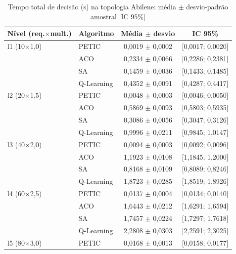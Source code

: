 \begin{table}[htb]
    \centering
    \small
    \caption{Tempo total de decisão (s) na topologia Abilene: média $\pm$ desvio-padrão amostral [IC 95\%]}
    \label{tab:tempo-abilene}
    \begin{tabular}{llcc}
        \hline
        Nível (req.$\times$mult.) & Algoritmo & Média $\pm$ desvio & IC 95\% \\
        \hline
        l1 (10$\times$1,0) & PETIC & 0,0019 $\pm$ 0,0002 & [0,0017; 0,0020] \\
         & ACO & 0,2334 $\pm$ 0,0066 & [0,2286; 0,2381] \\
         & SA & 0,1459 $\pm$ 0,0036 & [0,1433; 0,1485] \\
         & Q-Learning & 0,4352 $\pm$ 0,0091 & [0,4287; 0,4417] \\
        \hline
        l2 (20$\times$1,5) & PETIC & 0,0048 $\pm$ 0,0003 & [0,0046; 0,0050] \\
         & ACO & 0,5869 $\pm$ 0,0093 & [0,5803; 0,5935] \\
         & SA & 0,3086 $\pm$ 0,0056 & [0,3047; 0,3126] \\
         & Q-Learning & 0,9996 $\pm$ 0,0211 & [0,9845; 1,0147] \\
        \hline
        l3 (40$\times$2,0) & PETIC & 0,0094 $\pm$ 0,0003 & [0,0092; 0,0096] \\
         & ACO & 1,1923 $\pm$ 0,0108 & [1,1845; 1,2000] \\
         & SA & 0,8168 $\pm$ 0,0109 & [0,8089; 0,8246] \\
         & Q-Learning & 1,8723 $\pm$ 0,0285 & [1,8519; 1,8926] \\
        \hline
        l4 (60$\times$2,5) & PETIC & 0,0137 $\pm$ 0,0004 & [0,0134; 0,0140] \\
         & ACO & 1,6443 $\pm$ 0,0212 & [1,6291; 1,6594] \\
         & SA & 1,7457 $\pm$ 0,0224 & [1,7297; 1,7618] \\
         & Q-Learning & 2,2808 $\pm$ 0,0303 & [2,2591; 2,3025] \\
        \hline
        l5 (80$\times$3,0) & PETIC & 0,0168 $\pm$ 0,0013 & [0,0158; 0,0177] \\

\end{tabular}
\end{table}
